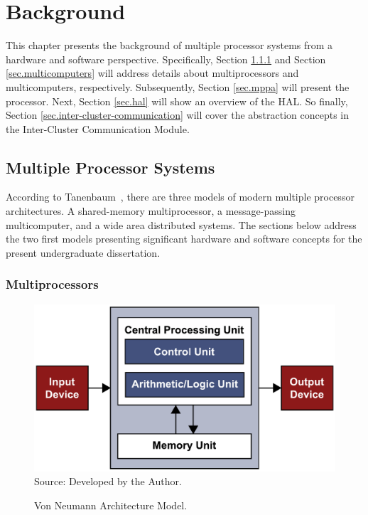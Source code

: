 \chapter{Background}
\label{ch.fundamentation}

	This chapter presents the background of multiple processor
	systems from a hardware and software perspective.
	Specifically, Section \ref{sec.multiprocessors} and Section \ref{sec.multicomputers}
	will address details about multiprocessors and multicomputers, respectively.
	Subsequently, Section \ref{sec.mppa} will present the \mppa processor.
	Next, Section \ref{sec.hal} will show an overview of the HAL.
	So finally, Section \ref{sec.inter-cluster-communication} will cover the abstraction
	concepts in the Inter-Cluster Communication Module.


\section{Multiple Processor Systems}
\label{sec.multiple-processor-systems}

	According to Tanenbaum~\cite{tanenbaum:4ed}, there are three models of
	modern multiple processor architectures.
	A shared-memory multiprocessor, a message-passing multicomputer, and a wide
	area distributed systems.
	The sections below address the two first models presenting significant
	hardware and software concepts for the present undergraduate dissertation.

	\subsection{Multiprocessors}
	\label{sec.multiprocessors}

		\begin{figure}[h]
			\centering
			\caption{Von Neumann Architecture Model.}
			\includegraphics[width=.8\textwidth]{images/neumann.pdf}
			\\ \vspace{0.3cm}
			Source: Developed by the Author.

			\label{fig.neumann}
		\end{figure}

